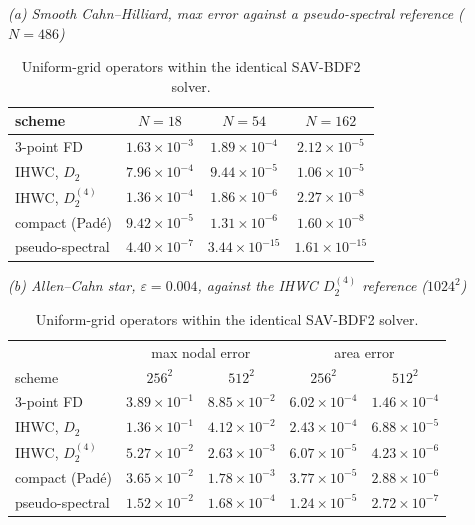 \documentclass[11pt]{article}
\begin{document}
\begin{table}[htbp]\centering\small
\caption{Uniform-grid operators within the identical SAV-BDF2 solver.}
\textit{(a) Smooth Cahn--Hilliard, max error against a pseudo-spectral reference ($N=486$)}\\[2pt]
\begin{tabular}{l ccc}
\toprule
scheme & $N=18$ & $N=54$ & $N=162$\\
\midrule
3-point FD & $1.63{\times}10^{-3}$ & $1.89{\times}10^{-4}$ & $2.12{\times}10^{-5}$\\
IHWC, $D_2$ & $7.96{\times}10^{-4}$ & $9.44{\times}10^{-5}$ & $1.06{\times}10^{-5}$\\
IHWC, $D_2^{(4)}$ & $1.36{\times}10^{-4}$ & $1.86{\times}10^{-6}$ & $2.27{\times}10^{-8}$\\
compact (Pad\'e) & $9.42{\times}10^{-5}$ & $1.31{\times}10^{-6}$ & $1.60{\times}10^{-8}$\\
pseudo-spectral & $4.40{\times}10^{-7}$ & $3.44{\times}10^{-15}$ & $1.61{\times}10^{-15}$\\
\bottomrule
\end{tabular}

\medskip
\textit{(b) Allen--Cahn star, $\varepsilon=0.004$, against the IHWC $D_2^{(4)}$ reference ($1024^2$)}\\[2pt]
\begin{tabular}{l cc cc}
\toprule
& \multicolumn{2}{c}{max nodal error} & \multicolumn{2}{c}{area error}\\
scheme & $256^2$ & $512^2$ & $256^2$ & $512^2$\\
\midrule
3-point FD & $3.89{\times}10^{-1}$ & $8.85{\times}10^{-2}$ & $6.02{\times}10^{-4}$ & $1.46{\times}10^{-4}$\\
IHWC, $D_2$ & $1.36{\times}10^{-1}$ & $4.12{\times}10^{-2}$ & $2.43{\times}10^{-4}$ & $6.88{\times}10^{-5}$\\
IHWC, $D_2^{(4)}$ & $5.27{\times}10^{-2}$ & $2.63{\times}10^{-3}$ & $6.07{\times}10^{-5}$ & $4.23{\times}10^{-6}$\\
compact (Pad\'e) & $3.65{\times}10^{-2}$ & $1.78{\times}10^{-3}$ & $3.77{\times}10^{-5}$ & $2.88{\times}10^{-6}$\\
pseudo-spectral & $1.52{\times}10^{-2}$ & $1.68{\times}10^{-4}$ & $1.24{\times}10^{-5}$ & $2.72{\times}10^{-7}$\\
\bottomrule
\end{tabular}
\end{table}
\end{document}
